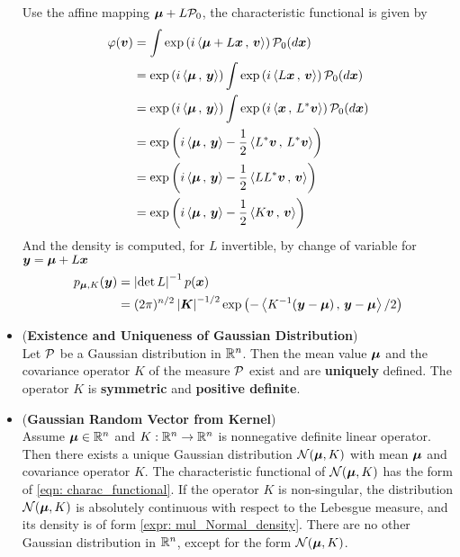 \documentclass[11pt]{article}
\begin{document}
\begin{itemize}
\begin{remark}
Use the affine mapping $\boldsymbol{\mu} + L{\mathcal P}_{0}$, the characteristic functional is given by 
\begin{align*}
\varphi(\boldsymbol{v}) &= \int \exp\left(i \left\langle \boldsymbol{\mu} + L\boldsymbol{x}\,,\, \boldsymbol{v} \right\rangle\right){\mathcal P}_{0}(d\boldsymbol{x})\\
&= \exp\left(i \left\langle \boldsymbol{\mu}\,,\, \boldsymbol{y} \right\rangle\right)\int \exp\left(i \left\langle L\boldsymbol{x}\,,\, \boldsymbol{v} \right\rangle\right){\mathcal P}_{0}(d\boldsymbol{x})\\
&= \exp\left(i \left\langle \boldsymbol{\mu}\,,\, \boldsymbol{y} \right\rangle\right)\int \exp\left(i \left\langle \boldsymbol{x}\,,\, L^{*}\boldsymbol{v} \right\rangle\right){\mathcal P}_{0}(d\boldsymbol{x})\\
&= \exp\left(i \left\langle \boldsymbol{\mu}\,,\, \boldsymbol{y} \right\rangle - \frac{1}{2}\left\langle L^{*}\boldsymbol{v}\,,\, L^{*}\boldsymbol{v} \right\rangle\right)\\
&= \exp\left(i \left\langle \boldsymbol{\mu}\,,\, \boldsymbol{y} \right\rangle - \frac{1}{2}\left\langle LL^{*}\boldsymbol{v}\,,\, \boldsymbol{v} \right\rangle\right)\\
&= \exp\left(i \left\langle \boldsymbol{\mu}\,,\, \boldsymbol{y} \right\rangle - \frac{1}{2}\left\langle K\boldsymbol{v}\,,\, \boldsymbol{v} \right\rangle\right)
\end{align*}
And the density is computed, for $L$ invertible, by change of variable for $\boldsymbol{y}= \boldsymbol{\mu}+ L\boldsymbol{x}$
\begin{align*}
p_{\boldsymbol{\mu},K}(\boldsymbol{y}) &= \left\lvert \det L \right\rvert^{-1}p(\boldsymbol{x})\\
&= (2\pi)^{n/2}\left\lvert \boldsymbol{K} \right\rvert^{-1/2}\exp\left(- \left\langle K^{-1} (\boldsymbol{y}- \boldsymbol{\mu}) \,,\, \boldsymbol{y}- \boldsymbol{\mu} \right\rangle/2\right)
\end{align*}
\end{remark}

\item \begin{proposition} (\textbf{Existence and Uniqueness of Gaussian Distribution})\citep{lifshits2013gaussian}\\
Let ${\mathcal P}$ be a Gaussian distribution in ${\mathbb R}^{n}$. Then the mean value $\boldsymbol{\mu}$ and the covariance operator $K$ of the measure ${\mathcal P}$ exist and are \textbf{uniquely} defined. The operator $K$ is \textbf{symmetric} and \textbf{positive definite}.  
\end{proposition}

\item \begin{proposition} (\textbf{Gaussian Random Vector from Kernel}) \citep{lifshits2013gaussian}\\
Assume $\boldsymbol{\mu}\in {\mathbb R}^{n}$ and $K: {\mathbb R}^{n}\rightarrow {\mathbb R}^{n}$ is nonnegative definite linear operator. Then there exists a unique Gaussian distribution ${\mathcal N}(\boldsymbol{\mu}, K)$ with mean $\boldsymbol{\mu}$ and covariance operator $K$. The characteristic functional of ${\mathcal N}(\boldsymbol{\mu}, K)$  has the form of \eqref{eqn: charac_functional}. If the operator $K$ is non-singular, the distribution ${\mathcal N}(\boldsymbol{\mu}, K)$ is absolutely continuous with respect to the Lebesgue measure, and its density is of form \eqref{expr: mul_Normal_density}. There are no other Gaussian distribution in ${\mathbb R}^{n}$, except for the form ${\mathcal N}(\boldsymbol{\mu}, K)$.  
\end{proposition}
\end{itemize}
\end{document}
